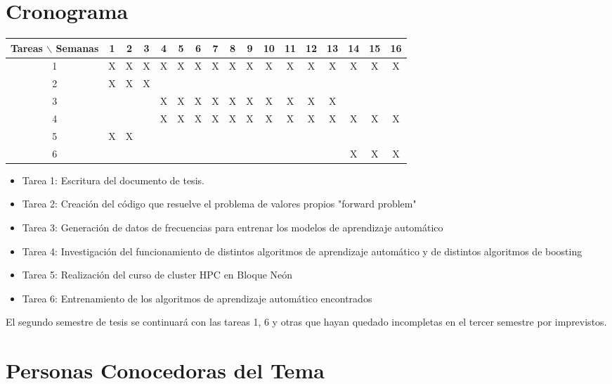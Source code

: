 \documentclass[12pt]{article}
\begin{document}
\section{Cronograma}

\begin{table}[H]
	\begin{tabular}{|c|cccccccccccccccc| }
	\hline
	Tareas $\backslash$ Semanas & 1 & 2 & 3 & 4 & 5 & 6 & 7 & 8 & 9 & 10 & 11 & 12 & 13 & 14 & 15 & 16  \\
	\hline
	1 & X & X & X & X & X & X & X & X & X & X & X & X & X & X & X & X \\
	2 & X & X & X &   &   &   &   &   &   &   &   &   &   &   &   &   \\
	3 &   &   &   & X & X & X & X & X & X & X & X & X & X &   &   &   \\
	4 &   &   &   & X & X & X & X & X & X & X & X & X & X & X & X & X \\
	5 & X & X &   &   &   &   &   &   &   &   &   &   &   &   &   &   \\
	6 &   &   &   &   &   &   &   &   &   &   &   &   &   & X & X & X \\
	\hline
	\end{tabular}
\end{table}
\vspace{1mm}

\begin{itemize}
	\item Tarea 1: Escritura del documento de tesis.
	\item Tarea 2: Creación del código que resuelve el problema de valores propios "forward problem"
	\item Tarea 3: Generación de datos de frecuencias para entrenar los modelos de aprendizaje automático
	\item Tarea 4: Investigación del funcionamiento de distintos algoritmos de aprendizaje automático y de distintos algoritmos de boosting
	\item Tarea 5: Realización del curso de cluster HPC en Bloque Neón
	\item Tarea 6: Entrenamiento de los algoritmos de aprendizaje automático encontrados
\end{itemize}

El segundo semestre de tesis se continuará con las tareas 1, 6 y otras que hayan quedado incompletas en el tercer semestre por imprevistos. 

\section{Personas Conocedoras del Tema}
\end{document}
